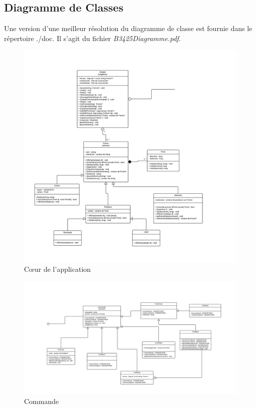 \documentclass[12pt]{article}
\begin{document}
\subsection{Diagramme de Classes}
Une version d'une meilleur résolution du diagramme de classe est fournie dans le répertoire ./doc. Il s'agit du fichier \textit{ B3425Diagramme.pdf}. 
\begin{figure}[!h]
\begin{center}
\includegraphics*[scale = 0.40]{Tp4Modele.png}
\caption{C\oe{}ur de l'application}
\label{fig:Modele}

\end{center}
\end{figure}

\begin{figure}
\begin{center}
\includegraphics[scale = 0.44]{Tp4Commande.png}
\caption{Commande}
\label{fig:Commande}
\end{center}
\end{figure}
\end{document}
